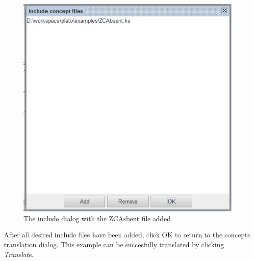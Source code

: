 \documentclass[british,technote,compsoc]{IEEEtran}
\begin{document}
\begin{figure}[H]
\begin{centering}
\includegraphics[scale=0.5]{images/include_dialog_ZCAbsent.png}
\par\end{centering}

\begin{centering}
\protect\caption{\label{fig:include_dialog_ZCAbsent}The include dialog with the ZCAsbent file added.}

\par\end{centering}

\end{figure}

\noindent After all desired include files have been added, click OK to return to the concepts translation dialog. This example can be succesfully translated by clicking \emph{Translate}.
\end{document}
